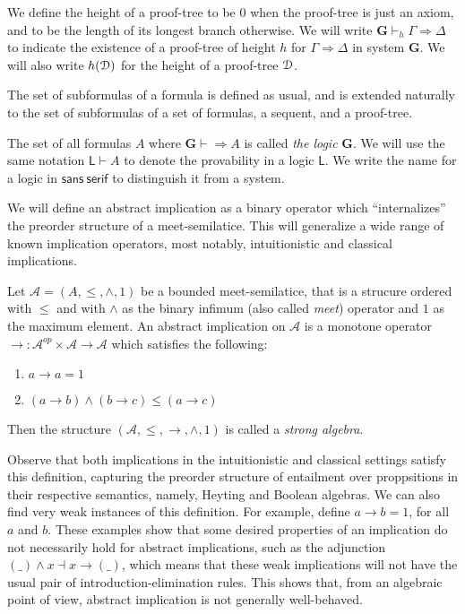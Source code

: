 We define the height of a proof-tree to be $0$ when the proof-tree is just an axiom, and to be the length of its longest branch otherwise.
We will write $\mathbf{G} \vdash_h \Gamma \Rightarrow \Delta$ to indicate the existence of a proof-tree of height $h$ for $\Gamma \Rightarrow \Delta$ in system $\mathbf{G}$. We will also write $h(\mathcal{D})$ for the height of a proof-tree $\mathcal{D}$.

The set of subformulas of a formula is defined as usual, and is extended naturally to the set of subformulas of a set of formulas, a sequent, and a proof-tree.

The set of all formulas $A$ where $\mathbf{G} \vdash \Rightarrow A$ is called \emph{the logic} $\mathbf{G}$. We will use the same notation $\mathsf{L} \vdash A$ to denote the provability in a logic $\mathsf{L}$. We write the name for a logic in $\mathsf{sans~serif}$ to distinguish it from a system.

We will define an abstract implication as a binary operator which ``internalizes'' the preorder structure of a meet-semilatice. This will generalize a wide range of known implication operators, most notably, intuitionistic and classical implications.
\begin{dfn}
  Let $\mathcal{A} = (A, \le, \wedge, 1)$ be a bounded meet-semilatice, that is a strucure ordered with $\le$ and with $\wedge$ as the binary infimum (also called \emph{meet}) operator and $1$ as the maximum element. An abstract implication on $\mathcal{A}$ is a monotone operator $\rightarrow : \mathcal{A}^{op} \times \mathcal{A} \rightarrow \mathcal{A}$ which satisfies the following:
  \begin{enumerate}
    \item $a \rightarrow a = 1$
    \item $(a \rightarrow b) \wedge (b \rightarrow c) \le (a \rightarrow c)$
  \end{enumerate}
  Then the structure $(\mathcal{A}, \le, \rightarrow, \wedge, 1)$ is called a \emph{strong algebra}.
  \end{dfn}
  Observe that both implications in the intuitionistic and classical settings satisfy this definition, capturing the preorder structure of entailment over proppsitions in their respective semantics, namely, Heyting and Boolean algebras. We can also find very weak instances of this definition. For example, define $a \rightarrow b = 1$, for all $a$ and $b$. These examples show that some desired properties of an implication do not necessarily hold for abstract implications, such as the adjunction $(\_) \wedge x \dashv x \rightarrow (\_)$, which means that these weak implications will not have the usual pair of introduction-elimination rules. This shows that, from an algebraic point of view, abstract implication is not generally well-behaved.
  
